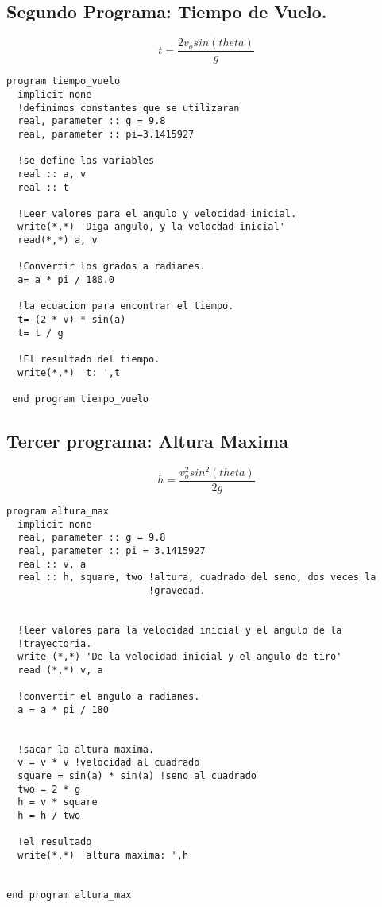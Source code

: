 \documentclass{article}
\begin{document}
\subsection{Segundo Programa: Tiempo de Vuelo.}
\begin {equation}
t = \frac {2v_o sin(theta)} {g}
\end {equation}
\begin{verbatim}
program tiempo_vuelo
  implicit none
  !definimos constantes que se utilizaran
  real, parameter :: g = 9.8
  real, parameter :: pi=3.1415927

  !se define las variables
  real :: a, v
  real :: t

  !Leer valores para el angulo y velocidad inicial.
  write(*,*) 'Diga angulo, y la velocdad inicial'
  read(*,*) a, v

  !Convertir los grados a radianes.
  a= a * pi / 180.0

  !la ecuacion para encontrar el tiempo.
  t= (2 * v) * sin(a)
  t= t / g

  !El resultado del tiempo.
  write(*,*) 't: ',t

 end program tiempo_vuelo
\end{verbatim}

\clearpage
\subsection{Tercer programa: Altura Maxima}
\begin {equation}
h = \frac {v^2_o sin^2(theta)} {2g}
\end {equation}
\begin{verbatim}
program altura_max
  implicit none
  real, parameter :: g = 9.8
  real, parameter :: pi = 3.1415927
  real :: v, a
  real :: h, square, two !altura, cuadrado del seno, dos veces la
                         !gravedad.
  

  !leer valores para la velocidad inicial y el angulo de la
  !trayectoria.
  write (*,*) 'De la velocidad inicial y el angulo de tiro'
  read (*,*) v, a

  !convertir el angulo a radianes.
  a = a * pi / 180


  !sacar la altura maxima.
  v = v * v !velocidad al cuadrado
  square = sin(a) * sin(a) !seno al cuadrado
  two = 2 * g
  h = v * square
  h = h / two

  !el resultado
  write(*,*) 'altura maxima: ',h


end program altura_max
\end{verbatim}
\end{document}
